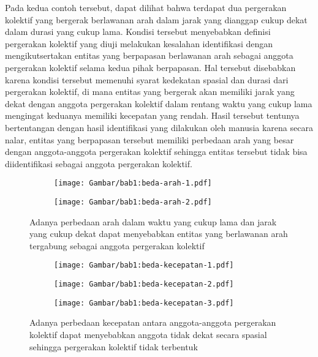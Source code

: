 Pada kedua contoh tersebut, dapat dilihat bahwa terdapat dua pergerakan kolektif yang bergerak berlawanan arah dalam jarak yang dianggap cukup dekat dalam durasi yang cukup lama. Kondisi tersebut menyebabkan definisi pergerakan kolektif yang diuji melakukan kesalahan identifikasi dengan mengikutsertakan entitas yang berpapasan berlawanan arah sebagai anggota pergerakan kolektif selama kedua pihak berpapasan. Hal tersebut disebabkan karena kondisi tersebut memenuhi syarat kedekatan spasial dan durasi dari pergerakan kolektif, di mana entitas yang bergerak akan memiliki jarak yang dekat dengan anggota pergerakan kolektif dalam rentang waktu yang cukup lama mengingat keduanya memiliki kecepatan yang rendah. Hasil tersebut tentunya bertentangan dengan hasil identifikasi yang dilakukan oleh manusia karena secara nalar, entitas yang berpapasan tersebut memiliki perbedaan arah yang besar dengan anggota-anggota pergerakan kolektif sehingga entitas tersebut tidak bisa diidentifikasi sebagai anggota pergerakan kolektif.

\begin{figure}[t]
    \centering
    \captionsetup{width=0.85\textwidth}
    \begin{subfigure}[h]{0.45\textwidth}
        \centering
        \texttt{[image: Gambar/bab1:beda-arah-1.pdf]}
    \end{subfigure} \hspace{0.25cm}
    \begin{subfigure}[h]{0.45\textwidth}
        \centering
        \texttt{[image: Gambar/bab1:beda-arah-2.pdf]}
    \end{subfigure}
    \caption[Masalah perbedaan arah pada identifikasi pergerakan kolektif]{Adanya perbedaan arah dalam waktu yang cukup lama dan jarak yang cukup dekat dapat menyebabkan entitas yang berlawanan arah tergabung sebagai anggota pergerakan kolektif}
    \label{bab1:beda-arah}
\end{figure}

\begin{figure}[t]
    \centering
    \captionsetup{width=0.75\textwidth}
    \begin{subfigure}[h]{0.225\textwidth}
        \centering
        \texttt{[image: Gambar/bab1:beda-kecepatan-1.pdf]}
    \end{subfigure}
    \begin{subfigure}[h]{0.225\textwidth}
        \centering
        \texttt{[image: Gambar/bab1:beda-kecepatan-2.pdf]}
    \end{subfigure}
    \begin{subfigure}[h]{0.225\textwidth}
        \centering
        \texttt{[image: Gambar/bab1:beda-kecepatan-3.pdf]}
    \end{subfigure}
    \caption[Masalah perbedaan kecepatan pada identifikasi pergerakan kolektif]{Adanya perbedaan kecepatan antara anggota-anggota pergerakan kolektif dapat menyebabkan anggota tidak dekat secara spasial sehingga pergerakan kolektif tidak terbentuk}
    \label{bab1:beda-kecepatan}
\end{figure}


